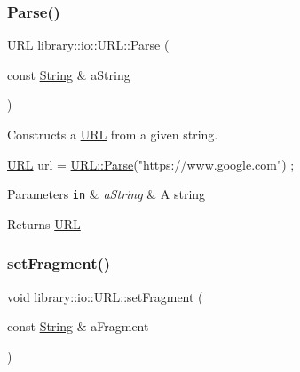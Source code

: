 \subsubsection{\texorpdfstring{Parse()}{Parse()}}
{\footnotesize\ttfamily \hyperlink{classlibrary_1_1io_1_1_u_r_l}{U\+RL} library\+::io\+::\+U\+R\+L\+::\+Parse (\begin{DoxyParamCaption}\item[{const \hyperlink{namespacelibrary_1_1io_a7469b45835a4421045db344d6a5a1f85}{String} \&}]{a\+String }\end{DoxyParamCaption})\hspace{0.3cm}{\ttfamily [static]}}



Constructs a \hyperlink{classlibrary_1_1io_1_1_u_r_l}{U\+RL} from a given string. 


\begin{DoxyCode}
\hyperlink{classlibrary_1_1io_1_1_u_r_l_a7e9c070138a6dbd000ffb10b7cd8a5c4}{URL} url = \hyperlink{classlibrary_1_1io_1_1_u_r_l_a03a589af0787df20428d4d33e26bb2d7}{URL::Parse}(\textcolor{stringliteral}{"https://www.google.com"}) ;
\end{DoxyCode}



\begin{DoxyParams}[1]{Parameters}
\mbox{\tt in}  & {\em a\+String} & A string \\
\hline
\end{DoxyParams}
\begin{DoxyReturn}{Returns}
\hyperlink{classlibrary_1_1io_1_1_u_r_l}{U\+RL} 
\end{DoxyReturn}
\mbox{\label{classlibrary_1_1io_1_1_u_r_l_a0ae406ca81b40b02761918ad953a4255}} 
\subsubsection{\texorpdfstring{set\+Fragment()}{setFragment()}}
{\footnotesize\ttfamily void library\+::io\+::\+U\+R\+L\+::set\+Fragment (\begin{DoxyParamCaption}\item[{const \hyperlink{namespacelibrary_1_1io_a7469b45835a4421045db344d6a5a1f85}{String} \&}]{a\+Fragment }\end{DoxyParamCaption})}



